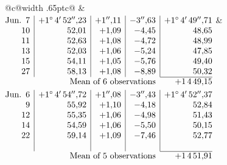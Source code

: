 \noindent\begin{tabular}{@{}c@{\hspace{.4em}\vrule width .65pt\hspace{.4em}}c@{}}
 &
 \\[.18ex]
\(\begin{array}[t]{@{}r|r|r|r|r@{}}
\text{Jun.}\enspace 7 & +1^\circ\,4'\,52''{,}23 & +1''{,}11 & -3''{,}63 & +1^\circ\,4'\,49''{,}71\\
10 & 52{,}01 & +1{,}09 & -4{,}45 & 48{,}65\\
11 & 52{,}63 & +1{,}08 & -4{,}72 & 48{,}99\\
13 & 52{,}03 & +1{,}06 & -5{,}24 & 47{,}85\\
15 & 54{,}11 & +1{,}05 & -5{,}76 & 49{,}40\\
27 & 58{,}13 & +1{,}08 & -8{,}89 & 50{,}32\\
\cline{5-5}
\multicolumn{4}{r}{\text{Mean of 6 observations}} & +1\,4\,49{,}15
\end{array}\)
&
\(\begin{array}[t]{@{}r|r|r|r|r@{}}
\text{Jun.}\enspace 6 & +1^\circ\,4'\,54''{,}72 & +1''{,}08 & -3''{,}43 & +1^\circ\,4'\,52''{,}37\\
9 & 55{,}92 & +1{,}10 & -4{,}18 & 52{,}84\\
12 & 55{,}35 & +1{,}06 & -4{,}98 & 51{,}43\\
14 & 54{,}59 & +1{,}06 & -5{,}50 & 50{,}15\\
22 & 59{,}14 & +1{,}09 & -7{,}46 & 52{,}77\\
 & & & & \\
\cline{5-5}
\multicolumn{4}{r}{\text{Mean of 5 observations}} & +1\,4\,51{,}91
\end{array}\)
\end{tabular}\par\medskip
{}
